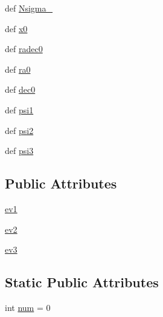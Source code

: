 \begin{DoxyCompactItemize}
def \hyperlink{classamonpy_1_1anal_1_1cluster_1_1_fisher__tp_ae0f081a73cd37010cb67adad216a897b}{Nsigma\-\_}
\item 
def \hyperlink{classamonpy_1_1anal_1_1cluster_1_1_fisher__tp_a604d04ddafd3c54e9ad325adb5e2556b}{x0}
\item 
def \hyperlink{classamonpy_1_1anal_1_1cluster_1_1_fisher__tp_a42d446196e564fc5317470a06cfbba06}{radec0}
\item 
def \hyperlink{classamonpy_1_1anal_1_1cluster_1_1_fisher__tp_a6fd4dc5594118f856b0b92f300168c29}{ra0}
\item 
def \hyperlink{classamonpy_1_1anal_1_1cluster_1_1_fisher__tp_a53495bcf6ab1da20791abc5995e91b80}{dec0}
\item 
def \hyperlink{classamonpy_1_1anal_1_1cluster_1_1_fisher__tp_a3c0bdae70739eb63d804b83bd45cebf2}{psi1}
\item 
def \hyperlink{classamonpy_1_1anal_1_1cluster_1_1_fisher__tp_af15569d830935e813e16a0a073de023a}{psi2}
\item 
def \hyperlink{classamonpy_1_1anal_1_1cluster_1_1_fisher__tp_a2e521151db6f513eeaa52c62f3ae2657}{psi3}
\end{DoxyCompactItemize}
\subsection*{Public Attributes}
\begin{DoxyCompactItemize}
\item 
\hyperlink{classamonpy_1_1anal_1_1cluster_1_1_fisher__tp_a4b282e58dde2fdfc1c815e6f6d2fba5f}{ev1}
\item 
\hyperlink{classamonpy_1_1anal_1_1cluster_1_1_fisher__tp_a5aad4ba062a0103b45387fea062e00f9}{ev2}
\item 
\hyperlink{classamonpy_1_1anal_1_1cluster_1_1_fisher__tp_a222ee1411c4db3f384af8421292f2ec1}{ev3}
\end{DoxyCompactItemize}
\subsection*{Static Public Attributes}
\begin{DoxyCompactItemize}
\item 
int \hyperlink{classamonpy_1_1anal_1_1cluster_1_1_fisher__tp_a3eff8425c58f4b61a8bff758141bfc3e}{num} = 0
\end{DoxyCompactItemize}


